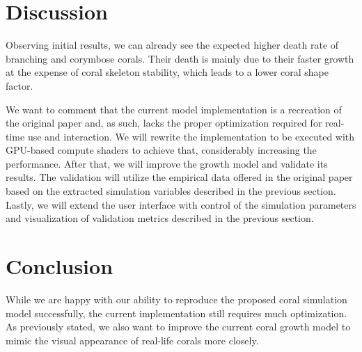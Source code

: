 \documentclass[9pt]{pnas-new}
\begin{document}
\section*{Discussion}

Observing initial results, we can already see the expected higher death rate of branching and corymbose corals. Their death is mainly due to their faster growth at the expense of coral skeleton stability, which leads to a lower coral shape factor.

We want to comment that the current model implementation is a recreation of the original paper and, as such, lacks the proper optimization required for real-time use and interaction. We will rewrite the implementation to be executed with GPU-based compute shaders to achieve that, considerably increasing the performance. After that, we will improve the growth model and validate its results. The validation will utilize the empirical data offered in the original paper based on the extracted simulation variables described in the previous section. Lastly, we will extend the user interface with control of the simulation parameters and visualization of validation metrics described in the previous section. 

\section*{Conclusion}

While we are happy with our ability to reproduce the proposed coral simulation model successfully, the current implementation still requires much optimization. As previously stated, we also want to improve the current coral growth model to mimic the visual appearance of real-life corals more closely.


\begin{multicols}{2}
\section*{\bibname}

\end{multicols}
\end{document}
